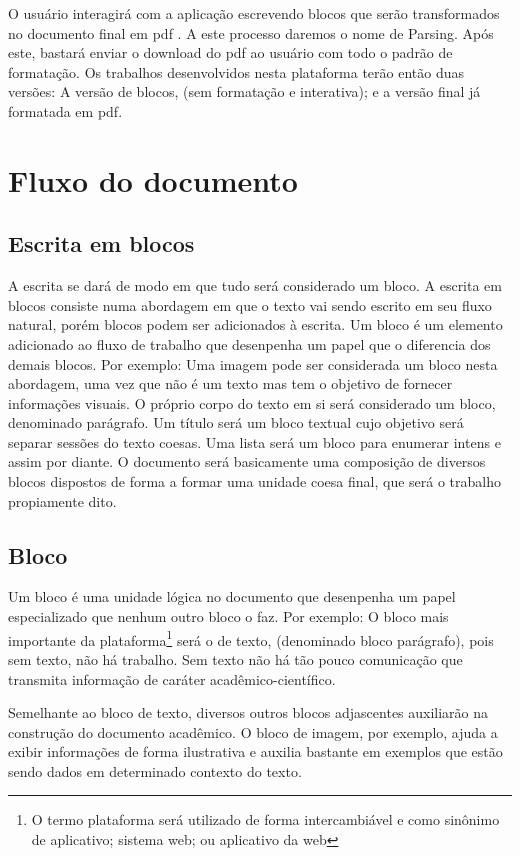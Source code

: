 O usuário interagirá com a aplicação escrevendo blocos que serão transformados
no documento final em
\acrshort{pdf}
. A este processo daremos o nome de Parsing. Após este, bastará
enviar o download do \acrshort{pdf}
ao usuário com todo o padrão de formatação. Os trabalhos desenvolvidos nesta plataforma
terão então duas versões: A versão de blocos, (sem formatação e interativa); e a versão
final já formatada em \acrshort{pdf}.

\section{Fluxo do documento}

\subsection{Escrita em blocos}

A escrita se dará de modo em que tudo será considerado um bloco.
A escrita em blocos consiste numa abordagem em que o texto vai sendo
escrito em seu fluxo natural, porém blocos podem ser adicionados à escrita.
Um bloco é um elemento adicionado ao fluxo de trabalho que desenpenha um papel
que o diferencia dos demais blocos.
Por exemplo: Uma imagem pode ser considerada um bloco nesta abordagem, uma vez
que não é um texto mas tem o objetivo de fornecer informações visuais. O próprio corpo
do texto em si será considerado um bloco, denominado parágrafo. Um título será um bloco
textual cujo objetivo será separar sessões do texto coesas. Uma lista será um bloco para enumerar
intens e assim por diante. O documento será basicamente uma composição de diversos blocos dispostos de forma a formar
uma unidade coesa final, que será o trabalho propiamente dito.

\subsection{Bloco}

Um bloco é uma unidade lógica no documento que desenpenha um papel especializado que nenhum
outro bloco o faz. Por exemplo: O bloco mais importante da
plataforma\footnote{O termo plataforma será utilizado
    de forma intercambiável e como sinônimo de aplicativo; sistema web; ou aplicativo da web}
será o de texto, (denominado bloco parágrafo), pois sem texto, não há trabalho.
Sem texto não há tão pouco comunicação que transmita informação
de caráter acadêmico-científico.

Semelhante ao bloco de texto, diversos outros blocos adjascentes
auxiliarão na construção do documento acadêmico. O bloco de imagem, por
exemplo, ajuda a exibir informações de forma ilustrativa e auxilia bastante
em exemplos que estão sendo dados em determinado contexto do texto.

